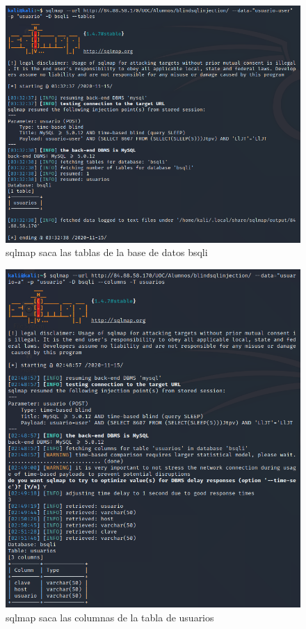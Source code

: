 \documentclass[a4paper,oneside]{article}
\begin{document}
\pagebreak
\begin{figure}[h!]
  \centering
  \includegraphics[scale=0.6]{images/sqlmap3.png}
  \caption{sqlmap saca las tablas de la base de datos bsqli}
  \label{fig:sqlmap3}
\end{figure}

\pagebreak
\begin{figure}[h!]
  \centering
  \includegraphics[scale=0.6]{images/sqlmap4.png}
  \caption{sqlmap saca las columnas de la tabla de usuarios}
  \label{fig:sqlmap4}
\end{figure}
\end{document}
